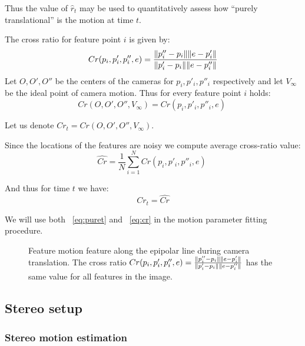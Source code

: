 \documentclass[10pt]{article}         %
\DeclarePairedDelimiter\norm{\lVert}{\rVert}%
\begin{document}
Thus the value of $\hat{r}_t$ may be used to quantitatively assess how
``purely translational'' is the motion at time $t$.

The cross ratio for feature point $i$ is given by:
\[
Cr(p_i,p'_i,p''_i,e) =
\frac{\norm{p''_i-p_i}\norm{e-p'_i}}{\norm{p'_i-p_i}\norm{e-p''_i}}
\]
Let $O,O',O''$ be the centers of the cameras for $p_i,p'_i,p''_i$
respectively and let $V_\infty$ be the ideal point of camera motion.
Thus for every feature point $i$ holds:
\[
Cr(O,O',O'',V_{\infty}) = Cr(p_i,p'_i,p''_i,e) \;
\]

Let us denote $Cr_t = Cr(O,O',O'',V_{\infty})$.

Since the locations of the features are noisy we compute average
cross-ratio value:
\[
\hat{Cr} =  \frac{1}{N}\sum_{i=1}^NCr(p_i,p'_i,p''_i,e) \;
\]

And thus for time $t$ we have:
\begin{equation}\label{eq:cr}
  Cr_t = \hat{Cr}
\end{equation}

We will use both ~\ref{eq:puret} and ~\ref{eq:cr} in the motion
parameter fitting procedure.

\begin{figure}[!h]
  \centering
  \caption{Feature motion feature along the epipolar line during
    camera translation.  The cross ratio $Cr(p_i,p'_i,p''_i,e) =
    \frac{\norm{p''_i-p_i}\norm{e-p'_i}}
    {\norm{p'_i-p_i}\norm{e-p''_i}}$ has the same value for all
    features in the image.}
  \label{fig:cross_ratio}
\end{figure}

\subsection{Stereo setup}

\subsubsection{Stereo motion estimation}\label{algo}
\end{document}
